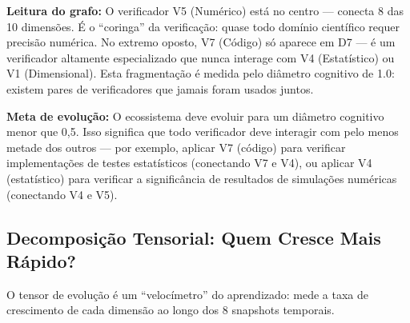 \textbf{Leitura do grafo:} O verificador V5 (Numérico) está no centro ---
conecta 8 das 10 dimensões. É o ``coringa'' da verificação: quase todo
domínio científico requer precisão numérica. No extremo oposto, V7 (Código)
só aparece em D7 --- é um verificador altamente especializado que nunca
interage com V4 (Estatístico) ou V1 (Dimensional). Esta fragmentação é
medida pelo diâmetro cognitivo de 1.0: existem pares de verificadores que
jamais foram usados juntos.

\textbf{Meta de evolução:} O ecossistema deve evoluir para um diâmetro
cognitivo menor que 0,5. Isso significa que todo verificador deve interagir
com pelo menos metade dos outros --- por exemplo, aplicar V7 (código) para
verificar implementações de testes estatísticos (conectando V7 e V4), ou
aplicar V4 (estatístico) para verificar a significância de resultados de
simulações numéricas (conectando V4 e V5).

\subsection{Decomposição Tensorial: Quem Cresce Mais Rápido?}

O tensor de evolução é um ``velocímetro'' do aprendizado: mede a taxa de
crescimento de cada dimensão ao longo dos 8 snapshots temporais.

